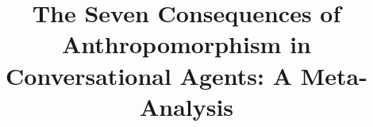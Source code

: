 \documentclass[manuscript,anonymous,sigconf]{acmart}
\begin{document}
\title{The Seven Consequences of Anthropomorphism in Conversational Agents: A Meta-Analysis}









\end{document}
